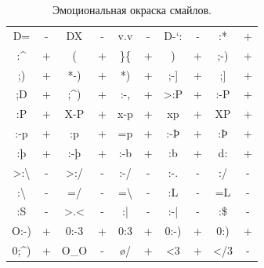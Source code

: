 \begin{table}[h]
\begin{tabular}{|cc|cc|cc|cc|cc|}
D=                          & -              & DX                     & -              & v.v              & -              & D-‘:           & -              & :*             & +              \\
:\textasciicircum *         & +              & (                      & +              & \}\{            & +              & )              & +              & ;-)            & +              \\
;)                          & +              & *-)                    & +              & *)               & +              & ;-{]}          & +              & ;{]}           & +              \\
;D                          & +              & ;\textasciicircum )    & +              & :-,              & +              & \textgreater:P & +              & :-P            & +              \\
:P                          & +              & X-P                    & +              & x-p              & +              & xp             & +              & XP             & +              \\
:-p                         & +              & :p                     & +              & =p               & +              & :-Þ            & +              & :Þ             & +              \\
:þ                          & +              & :-þ                    & +              & :-b              & +              & :b             & +              & d:             & +              \\
\textgreater:\textbackslash & -              & \textgreater:/         & -              & :-/              & -              & :-.            & -              & :/             & -              \\
:\textbackslash             & -              & =/                     & -              & =\textbackslash  & -              & :L             & -              & =L             & -              \\
:S                          & -              & \textgreater.\textless & -              & :|               & -              & :-|            & -              & :\$            & -              \\
O:-)                        & +              & 0:-3                   & +              & 0:3              & +              & 0:-)           & +              & 0:)            & +              \\
0;\textasciicircum )        & +              & O\_O                   & -              & \o/              & +              & \textless3     & +              & \textless/3    & -              \\ \hline
\end{tabular}\caption{Эмоциональная окраска смайлов.}\label{tab:smileys}
\end{table}

